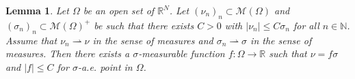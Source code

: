 \documentclass[12pt,reqno]{amsart}
\newtheorem{lemma}[theorem]{Lemma}
\def \O{{\Omega}}
\def\M{{\mathcal M}}
\newcommand{\R}{\mathbb{R}}
\numberwithin{equation}{section}
\begin{document}
\begin{lemma}\label{lem:th_measure}
Let \(\Omega\) be an open set of \(\R^N\). Let \( (\nu_n)_n\subset \M(\Omega)\) and \((\sigma_n)_n\subset \M(\O)^+\) be such that there exists \(C>0\) with \(|\nu_n|\leq C \sigma_n\) for all \(n\in \mathbb{N}\). Assume that \(\nu_n \rightharpoonup \nu\) in the sense of measures and \(\sigma_n \rightharpoonup \sigma\) in the sense of measures. Then there exists a \(\sigma\)-measurable function \(f:\Omega\rightarrow \R\) such that \(\nu=f \sigma\) and \(|f|\leq C\) for \(\sigma\)-a.e. point in \(\O\).
\end{lemma}



\end{document}
